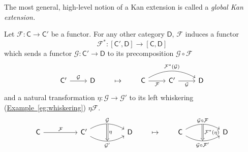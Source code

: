 \documentclass[notes.tex]{subfiles}
\begin{document}
The most general, high-level notion of a Kan extension is called a \emph{global Kan extension.}

Let $\mathcal{F}\colon \mathsf{C} \to \mathsf{C}'$ be a functor. For any other category $\mathsf{D}$, $\mathcal{F}$ induces a functor
\begin{equation*}
  \mathcal{F}^{*}\colon [\mathsf{C}', \mathsf{D}] \to [\mathsf{C}, \mathsf{D}]
\end{equation*}
which sends a functor $\mathcal{G}\colon \mathsf{C}' \to \mathsf{D}$ to its precomposition $\mathcal{G} \circ \mathcal{F}$
\begin{equation*}
  \begin{tikzcd}
    \mathsf{C}'
    \arrow[r, "\mathcal{G}"]
    & \mathsf{D}
  \end{tikzcd}
  \qquad
  \mapsto
  \qquad
  \begin{tikzcd}
    \mathsf{C}
    \arrow[r, swap, "\mathcal{F}"]
    \arrow[rr, bend left, "\mathcal{F}^{*}(\mathcal{G})"]
    & \mathsf{C'}
    \arrow[r, swap, "\mathcal{G}"]
    & \mathsf{D}
  \end{tikzcd}
\end{equation*}
and a natural transformation $\eta\colon \mathcal{G} \to \mathcal{G}'$ to its left whiskering (\hyperref[eg:whiskering]{Example~\ref*{eg:whiskering}}) $\eta\mathcal{F}$.
\begin{equation*}
  \begin{tikzcd}[column sep=huge]
    \mathsf{C}
    \arrow[r, "\mathcal{F}"]
    &\mathsf{C}'
    \arrow[r, bend left, "\mathcal{G}"{name=U}]
    \arrow[r, bend right, swap, "\mathcal{G}'"{name=D}]
    & \mathsf{D}
    \arrow[from=U, to=D, Rightarrow, "\eta"]
  \end{tikzcd} 
  \qquad
  \mapsto
  \qquad
  \begin{tikzcd}[column sep=huge]
    \mathsf{C}
    \arrow[r, bend left, "\mathcal{G} \circ \mathcal{F}"{name=U}]
    \arrow[r, bend right, swap, "\mathcal{G} \circ \mathcal{F}'"{name=D}]
    & \mathsf{D}
    \arrow[from=U, to=D, Rightarrow, "\mathcal{F}^{*}(\eta)"]
  \end{tikzcd}
\end{equation*}
\end{document}
